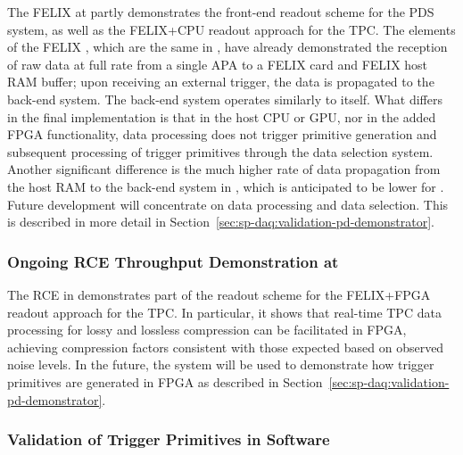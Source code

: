 
The FELIX  at  partly demonstrates the front-end readout scheme for
the PDS system, as well as the FELIX+CPU readout approach for the
TPC. The elements of the  FELIX , which are the
same in , have already demonstrated the
reception of raw data at full rate from a single APA to a 
FELIX card and FELIX host RAM buffer; upon receiving an external trigger, the
data is propagated to the back-end system. The back-end system
operates similarly to  itself. What differs in the final 
implementation is that in the host CPU or
GPU, nor in the added FPGA functionality, data processing does not trigger primitive generation and subsequent processing
of trigger primitives through the data selection system. Another
significant difference is the much higher rate of data propagation from the
host RAM to the back-end system in , which is anticipated to be lower for . Future development
will concentrate on data processing and data selection.  This is described in more detail in Section~\ref{sec:sp-daq:validation-pd-demonstrator}.

\subsubsection{Ongoing RCE Throughput Demonstration at }
\label{sec:sp-daq:validation-pdune-rce}

The RCE  in  demonstrates part of the readout scheme for
the FELIX+FPGA readout approach for the TPC. In particular, it
shows that real-time TPC data processing for lossy
and lossless compression can be facilitated in FPGA, achieving
compression factors consistent with those expected based on observed
 noise levels. In the future, the system will be used
to demonstrate how trigger primitives are generated in FPGA as
described in Section~\ref{sec:sp-daq:validation-pd-demonstrator}.

\subsubsection{Validation of Trigger Primitives in Software}
\label{sec:sp-daq:validation-software-trigger-primitives}

